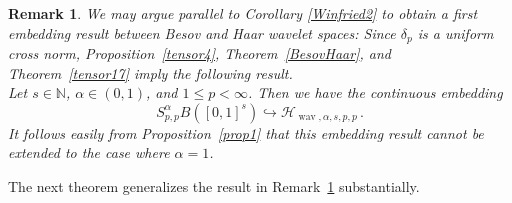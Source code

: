 \documentclass[12pt]{article}
\DeclareMathOperator{\wav}{wav}
\newtheorem{corollary}{Corollary}
\newtheorem{remark}{Remark}
\newcommand{\HH}{\mathcal{H}}
\newcommand{\N}{\mathbb{N}}
\begin{document}

\begin{remark}\label{Rem:Emb_Bes_Wav_pp}
We may argue parallel to Corollary \ref{Winfried2} to obtain a first embedding result between Besov and Haar wavelet spaces: Since $\delta_p$ is a uniform cross norm, %
Proposition~\ref{tensor4}, 
Theorem~\ref{BesovHaar}, 
and %
Theorem~\ref{tensor17}
imply the following result.\\
Let $s\in \N$, $\alpha\in (0,1)$, and $1 \le p< \infty$.
Then we have the continuous embedding
\begin{equation*}
S^{\alpha}_{p,p} B([0,1]^{s}) \hookrightarrow  \HH_{\wav,\alpha,s,p,p} \, .
\end{equation*}
It follows easily from Proposition~\ref{prop1} that
this %
embedding result %
cannot be extended to
the case where $\alpha =1$. 
\end{remark}

The next theorem generalizes the result in Remark~\ref{Rem:Emb_Bes_Wav_pp} substantially.


\end{document}
